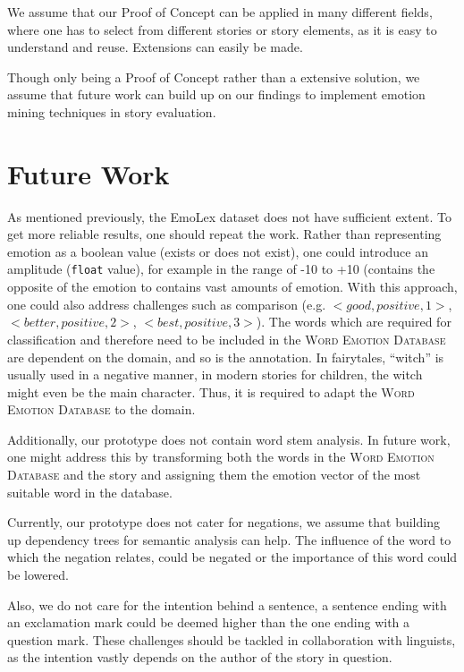 \documentclass[letterpaper]{article}
\begin{document}
We assume that our Proof of Concept can be applied in many different fields, where one has to select from different stories or story elements, as it is easy to understand and reuse. Extensions can easily be made. 

Though only being a Proof of Concept rather than a extensive solution, we assume that future work can build up on our findings to implement emotion mining techniques in story evaluation. 


\section{Future Work}

As mentioned previously, the EmoLex \cite{Mohammad} dataset does not have sufficient extent. To get more reliable results, one should repeat the work. Rather than representing emotion as a boolean value (exists or does not exist), one could introduce an amplitude (\texttt{float} value), for example in the range of -10 to +10 (contains the opposite of the emotion to contains vast amounts of emotion. With this approach, one could also address challenges such as comparison (e.g. $<good,positive,1>$, $<better,positive,2>$, $<best,positive,3>$). The words which are required for classification and therefore need to be included in the \textsc{Word Emotion Database} are dependent on the domain, and so is the annotation. In fairytales, ``witch'' is usually used in a negative manner, in modern stories for children, the witch might even be the main character. Thus, it is required to adapt the \textsc{Word Emotion Database} to the domain. 

Additionally, our prototype does not contain word stem analysis. In future work, one might address this by transforming both the words in the \textsc{Word Emotion Database} and the story and assigning them the emotion vector of the most suitable word in the database. 

Currently, our prototype does not cater for negations, we assume that building up dependency trees for semantic analysis can help. The influence of the word to which the negation relates, could be negated or the importance of this word could be lowered. 

Also, we do not care for the intention behind a sentence, a sentence ending with an exclamation mark could be deemed higher than the one ending with a question mark. These challenges should be tackled in collaboration with linguists, as the intention vastly depends on the author of the story in question. 
\end{document}
